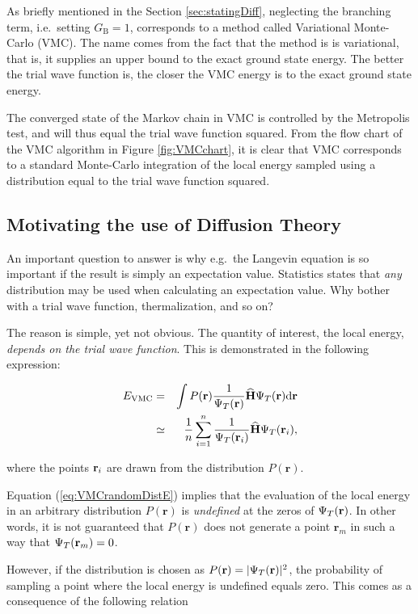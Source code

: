 As briefly mentioned in the Section \ref{sec:statingDiff}, neglecting the branching term, i.e.~setting $G_\mathrm{B}=1$, corresponds to a method called Variational Monte-Carlo (VMC). The name comes from the fact that the method is is variational, that is, it supplies an upper bound to the exact ground state energy. The better the trial wave function is, the closer the VMC energy is to the exact ground state energy.

The converged state of the Markov chain in VMC is controlled by the Metropolis test, and will thus equal the trial wave function squared. From the flow chart of the VMC algorithm in Figure \ref{fig:VMCchart}, it is clear that VMC corresponds to a standard Monte-Carlo integration of the local energy sampled using a distribution equal to the trial wave function squared.

\subsection{Motivating the use of Diffusion Theory}

An important question to answer is why e.g.~the Langevin equation is so important if the result is simply an expectation value. Statistics states that \textit{any} distribution may be used when calculating an expectation value. Why bother with a trial wave function, thermalization, and so on? 

The reason is simple, yet not obvious. The quantity of interest, the local energy, \textit{depends on the trial wave function}. This is demonstrated in the following expression:

\begin{eqnarray}
 E_\mathrm{VMC} &=& \int P(\mathbf{r}) \frac{1}{\Psi_T(\mathbf{r})}{\bf\widehat{H}}\Psi_T(\mathbf{r})\mathrm{d}\mathbf{r} \nonumber\\
                   &\simeq& \frac{1}{n}\sum_{i=1}^n \frac{1}{\Psi_T(\mathbf{r}_i)}{\bf\widehat{H}}\Psi_T(\mathbf{r}_i), \label{eq:VMCrandomDistE}
\end{eqnarray}

where the points $\mathbf{r}_i$ are drawn from the distribution $P(\mathbf{r})$.

Equation (\ref{eq:VMCrandomDistE}) implies that the evaluation of the local energy in an arbitrary distribution $P(\mathbf{r})$ is \textit{undefined} at the zeros of $\Psi_T(\mathbf{r})$. In other words, it is not guaranteed that $P(\mathbf{r})$ does not generate a point $\mathbf{r}_m$ in such a way that $\Psi_T(\mathbf{r}_m) = 0$. 

However, if the distribution is chosen as $P(\mathbf{r})=|\Psi_T(\mathbf{r})|^2$, the probability of sampling a point where the local energy is undefined equals zero. This comes as a consequence of the following relation

